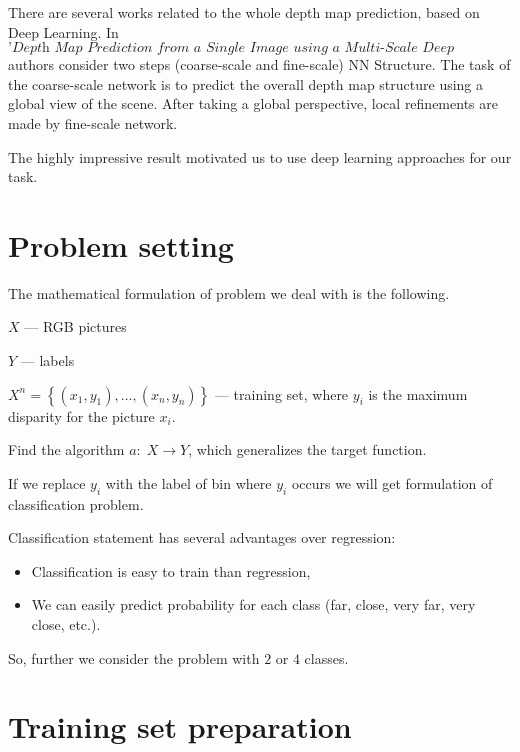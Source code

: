 \documentclass{article}
\begin{document}
    There are several works related to the whole depth map prediction, based
on Deep Learning. In
\(\textit{'Depth Map Prediction from a Single Image using a Multi-Scale Deep Network', 2015}\)
authors consider two steps (coarse-scale and fine-scale) NN Structure.
The task of the coarse-scale network is to predict the overall depth map
structure using a global view of the scene. After taking a global
perspective, local refinements are made by fine-scale network.

    \begin{figure}[htbp]
    \begin{center}
    \end{center}
\caption{}
\end{figure}

    The highly impressive result motivated us to use deep learning
approaches for our task.

    \section{Problem setting}\label{problem-setting}

    The mathematical formulation of problem we deal with is the following.

    \(X\) --- RGB pictures

\(Y\) --- labels

\(X^{n}=\left\{(x_1,y_1), \dots, (x_n,y_n)\right\}\) --- training set,
where \(y_i\) is the maximum disparity for the picture \(x_i\).

Find the algorithm \(a:\; X\to Y\), which generalizes the target
function.

If we replace \(y_i\) with the label of bin where \(y_i\) occurs we will
get formulation of classification problem.

    Classification statement has several advantages over regression:

\begin{itemize}
\item
  Classification is easy to train than regression,
\item
  We can easily predict probability for each class (far, close, very
  far, very close, etc.).
\end{itemize}

So, further we consider the problem with \(2\) or \(4\) classes.

    \section{Training set preparation}\label{training-set-preparation}
\end{document}
